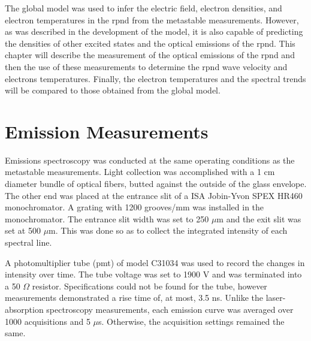 The global model was used to infer the electric field, electron densities, and
electron temperatures in the \acs{rpnd} from the metastable measurements.
However, as was described in the development of the model, it is also capable of
predicting the densities of other excited states and the optical emissions of
the \acs{rpnd}. This chapter will describe the measurement of the optical
emissions of the \acs{rpnd} and then the use of these measurements to determine
the \acs{rpnd} wave velocity and electrons temperatures. Finally, the electron
temperatures and the spectral trends will be compared to those obtained from the
global model.

\section{Emission Measurements}

Emissions spectroscopy was conducted at the same operating conditions as the
metastable measurements. Light collection was accomplished with a 1 cm diameter
bundle of optical fibers, butted against the outside of the glass envelope. The
other end was placed at the entrance slit of a ISA Jobin-Yvon SPEX HR460
monochromator. A grating with 1200 grooves/mm was installed in the
monochromator. The entrance slit width was set to 250 $\mu$m and the exit slit
was set at 500 $\mu$m. This was done so as to collect the integrated intensity
of each spectral line.

A photomultiplier tube (\acs{pmt}) of model C31034 was used to record the
changes in intensity over time. The tube voltage was set to 1900 V and was
terminated into a 50 $\Omega$ resistor. Specifications could not be found for
the tube, however measurements demonstrated a rise time of, at most, 3.5 ns.
Unlike the laser-absorption spectroscopy measurements, each emission curve was
averaged over 1000 acquisitions and 5 $\mu$s. Otherwise, the acquisition
settings remained the same.

